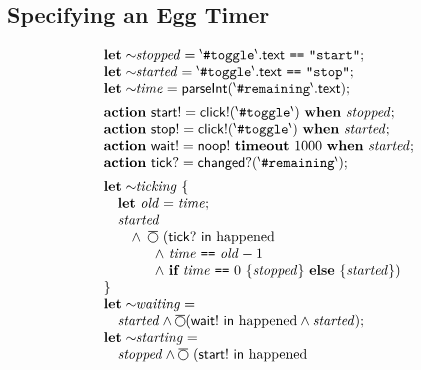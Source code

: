 \documentclass[sigplan,nonacm,10pt]{acmart}
\newcommand{\WNext}{\operatorname{%
  \tikz[baseline]{
    \draw[line width=.12ex]
      (0,.6ex) circle (.8ex);
      \draw[line width=.12ex] (-0.8ex,1.6ex) -- (0.8ex,1.6ex);
  }}}{}
\begin{document}
\subsection{Specifying an Egg Timer}
\begin{figure}
  $$
  \begin{array}{l}
  \textbf{let} \sim\!\!\mathit{stopped} = {}^\backprime\texttt{\#toggle}^\backprime.\mathsf{text}\ \texttt{==}\ \texttt{"start"};\\
  \textbf{let} \sim\!\!\mathit{started} = {}^\backprime\texttt{\#toggle}^\backprime.\mathsf{text}\ \texttt{==}\ \texttt{"stop"};\\
  \textbf{let} \sim\!\!\mathit{time} = \mathsf{parseInt}({}^\backprime\texttt{\#remaining}^\backprime.\mathsf{text});\\[0.5em]
  \textbf{action}\ \mathsf{start!} = \mathsf{click}!(^\backprime\texttt{\#toggle}^\backprime)\ \textbf{when}\ \mathit{stopped};\\
  \textbf{action}\ \mathsf{stop!} = \mathsf{click}!(^\backprime\texttt{\#toggle}^\backprime)\ \textbf{when}\ \mathit{started};\\
  \textbf{action}\ \mathsf{wait!} = \mathsf{noop}!\ \textbf{timeout}\ 1000\ \textbf{when}\ \mathit{started};\\
  \textbf{action}\ \mathsf{tick?} = \mathsf{changed}?({}^\backprime\texttt{\#remaining}^\backprime);\\[0.5em]
  \textbf{let} \sim\!\!\mathit{ticking}\ \{ \\ \quad \textbf{let}\ \mathit{old} = \mathit{time};
  \\ \quad  \mathit{started}
  \\ \qquad \land\ \WNext\ ( \mathsf{tick?}\ \mathsf{in}\ \mathrm{happened}\\\ \ \qquad\quad \land\ \mathit{time}\ \texttt{==}\ \mathit{old} - 1 \\\  \ \qquad\quad \land\ \textbf{if}\ \mathit{time}\ \texttt{==}\ 0\ \{ \mathit{stopped} \}\ \textbf{else}\ \{ \mathit{started} \}) \\ \}\\
  \textbf{let} \sim\!\!\mathit{waiting} =  \\\quad \mathit{started} \land \WNext (\mathsf{wait!}\ \mathsf{in}\ \mathrm{happened} \land \mathit{started});\\
  \textbf{let} \sim\!\!\mathit{starting} = \\
  \quad \mathit{stopped} \land \WNext\ (\mathsf{start!}\ \mathsf{in}\ \mathrm{happened}\\

\end{array}$$
\end{figure}
\end{document}

